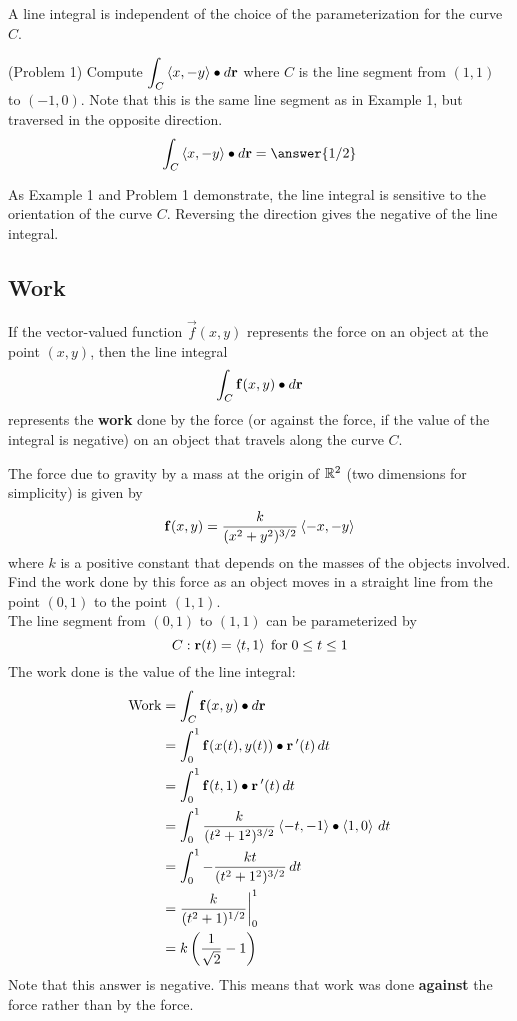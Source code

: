 \documentclass[handout]{ximera}
\begin{document}
\begin{remark}
A line integral is independent of the choice of the parameterization for the curve $C$. 
\end{remark}

\begin{problem}(Problem 1)
Compute $\displaystyle \int_C \left\langle x, -y\right\rangle \bullet d\mathbf r$ where $C$ is the line segment from $(1,1)$ to $(-1, 0)$.
Note that this is the same line segment as in Example 1, but traversed in the opposite direction.\\
\[
\int_C \vector{x, -y} \dotp d\vec r = \answer{1/2}
\]
\end{problem}

\begin{remark}
As Example 1 and Problem 1 demonstrate, the line integral is sensitive to the orientation of the curve $C$.
Reversing the direction gives the negative of the line integral.
\end{remark}

\subsection{Work}

If the vector-valued function $\vec f(x,y)$ represents the force on an object at the point $(x,y)$, then the line integral
\[
\int_C \mathbf f(x,y) \bullet  d\mathbf r
\]
represents the \textbf{work} done by the force (or against the force, if the value of the integral is negative) on an object that travels along the curve $C$.

\begin{example}[Example 2]
The force due to gravity by a mass at the origin of $\mathbb R^2$ (two dimensions for simplicity) is given by
\[
\mathbf f(x,y) = \frac{k}{(x^2 + y^2)^{3/2}} \left\langle -x, -y\right\rangle
\]
where $k$ is a positive constant that depends on the masses of the objects involved. Find the work done 
by this force as an object moves in a straight line from the point $(0,1)$ to the point $(1,1)$.\\
The line segment from $(0,1)$ to $(1,1)$ can be parameterized by
\[
C: \mathbf r(t) = \left\langle t, 1\right\rangle \; \text{for}   \; 0 \leq t \leq 1
\]
The work done is the value of the line integral:
\begin{align*}
\text{Work} &= \int_C \mathbf f(x,y) \bullet d\mathbf r\\
            &= \int_0^1 \mathbf f(x(t),y(t)) \bullet \mathbf r\,'(t) \, dt\\
            &= \int_0^1 \mathbf f(t, 1) \bullet \mathbf r\,'(t) \, dt\\
            &= \int_0^1 \frac{k}{(t^2 + 1^2)^{3/2}} \left\langle -t,-1\right\rangle \bullet \left\langle 1,0\right\rangle \, dt\\
            &= \int_0^1 -\frac{kt}{(t^2 + 1^2)^{3/2}} \, dt\\
            &= \frac{k}{(t^2 +1)^{1/2}} \bigg|_0^1 \\
            &= k\left(\frac{1}{\sqrt 2} - 1\right)
\end{align*}
Note that this answer is negative.  This means that work was done \textbf{against} the force rather than by the force.
\end{example}
\end{document}

